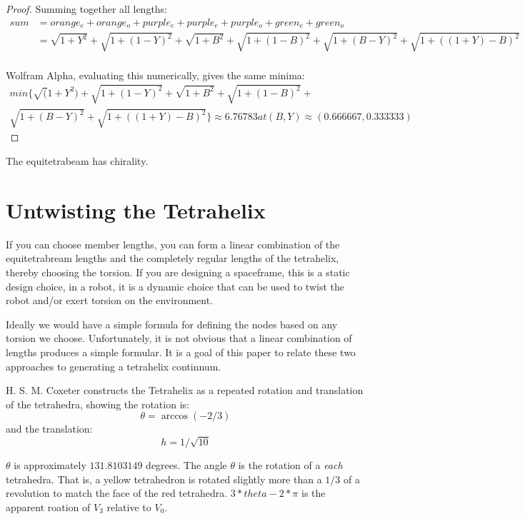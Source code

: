 \documentclass[11pt]{article}
\begin{document}
\begin{proof}
  Summing together all lengths:
  \begin{align*}
  sum &= orange_e + orange_o + purple_e + purple_e + purple_o + green_e + green_o \\    
  &= \sqrt{1 + Y^2} + \sqrt{1 + (1-Y)^2} + \sqrt{1 + B^2} + \sqrt{1+ (1-B)^2} +  \sqrt{1 + (B - Y)^2} +  \sqrt{1 + ((1+Y) - B)^2} \\
  \end{align*} 

  Wolfram Alpha, evaluating this numerically, gives the same minima:
\begin{align*}
  min\{\sqrt(1 + Y^2) + \sqrt{1 + (1 - Y)^2} + \sqrt{1 + B^2} + \sqrt{1 + (1 - B)^2} + \\
    \sqrt{1 + (B - Y)^2} + \sqrt{1 + ((1 + Y) - B)^2}\} \approx 6.76783 at (B, Y) \approx (0.666667, 0.333333)
\end{align*}
  
\end{proof}

The equitetrabeam has chirality.

\section{Untwisting the Tetrahelix}

If you can choose member lengths, you can form a linear combination of the equitetrabream lengths and the completely regular
lengths of the tetrahelix, thereby choosing the torsion.  If you are designing a spaceframe, this is a static design choice,
in a robot, it is a dynamic choice that can be used to twist the robot and/or exert torsion on the environment.

Ideally we would have a simple formula for defining the nodes based on any torsion we choose.
Unfortunately, it is not obvious that a linear combination of lengths produces a simple formular.
It is a goal of this paper to relate these two approaches to generating a tetrahelix continnum.

H. S. M. Coxeter constructs the Tetrahelix as a repeated rotation and translation of the tetrahedra, showing the
rotation is:
\[
\theta = \arccos(-2/3) 
\]
and the translation:
\[
h = 1/\sqrt{10}
\]


$\theta$ is approximately $131.8103149$ degrees.
The angle $\theta$ is the rotation of a \emph{each} tetrahedra.
That is, a yellow tetrahedron is rotated slightly more than a $1/3$ of a revolution to match the face of the red tetrahedra.
$3*theta - 2*\pi$ is the apparent roation of $V_3$ relative to $V_0$.
\end{document}
